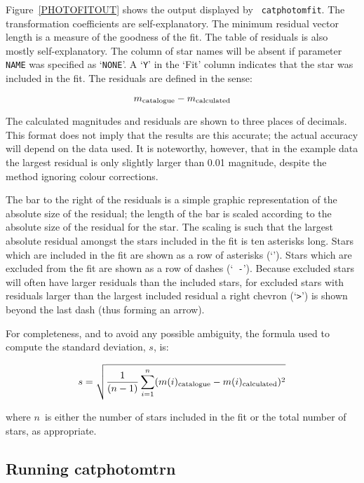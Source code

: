 \documentclass[twoside,11pt]{article}
\renewcommand{\_}{\texttt{\symbol{95}}}
\begin{document}
Figure~\ref{PHOTOFITOUT} shows the output displayed by {\tt
catphotomfit}.  The transformation coefficients are self-explanatory.
The minimum residual vector length is a measure of the goodness of the
fit.  The table of residuals is also mostly self-explanatory.  The column
of star names will be absent if parameter {\tt NAME} was specified as
`{\tt NONE}'.  A `{\tt Y}' in the `Fit' column indicates that the star
was included in the fit.  The residuals are defined in the sense:

\begin{equation}
m_{\rm catalogue} - m_{\rm calculated}
\end{equation}

The calculated magnitudes and residuals are shown to three places of
decimals.  This format does not imply that the results are this
accurate; the actual accuracy will depend on the data used.  It is
noteworthy, however, that in the example data the largest residual is
only slightly larger than 0.01 magnitude, despite the method ignoring
colour corrections.

The bar to the right of the residuals is a simple graphic
representation of the absolute size of the residual; the length of the
bar is scaled according to the absolute size of the residual for the
star.  The scaling is such that the largest absolute residual amongst
the stars included in the fit is ten asterisks long.  Stars which are
included in the fit are shown as a row of asterisks (`{\tt *}').  Stars
which are excluded from the fit are shown as a row of dashes (`{\tt
-}').  Because excluded stars will often have larger residuals than the
included stars, for excluded stars with residuals larger than the
largest included residual a right chevron (`\verb->-') is shown beyond
the last dash (thus forming an arrow).

For completeness, and to avoid any possible ambiguity, the formula used
to compute the standard deviation, $s$, is:

\begin{equation}
s = \sqrt{ \frac{1}{(n - 1)}
    \sum_{i=1}^{n} (m(i)_{\rm catalogue} - m(i)_{\rm calculated})^2 }
\end{equation}

where $n$\, is either the number of stars included in the fit or the
total number of stars, as appropriate.

\subsection{Running catphotomtrn}
\end{document}

